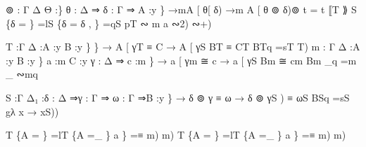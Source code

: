 \documentclass{acm_proc_article-sp}
\begin{document}
{\begin{code}
⊚ : \AgdaBound{\{}Γ Δ Θ :\}
       \AgdaBound{\{}θ : Δ ⇒ \AgdaBound{\{}δ : Γ ⇒ \AgdaBound{\{}A :y \}
       →m\AgdaSymbol{ (}\AgdaBound{(}A [ θ\AgdaFunction{ ]}\AgdaFunction{)}[ δ\AgdaFunction{ ]}) →m \AgdaBound{(}A [ θ ⊚ δ\AgdaFunction{ ]})⊚ t = t ⟦\AgdaFunction{ [⊚]}T ⟫
\AgdaFunction{
[+S]}S \{δ = \} =l\AgdaFunction{
[+S]}S \{δ = δ , \} =q\AgdaFunction{ [+S]}S p\AgdaFunction{ [⊚]}T ∾ m a ∾2\AgdaFunction{ [⊚]}) ∾+\AgdaFunction{ -})

T :\AgdaBound{\{}Γ Δ :\AgdaBound{\{}A :y \AgdaBound{\{}B :y \}
          \AgdaBound{\{}\AgdaBound{\{}\} → 
          A [ γ\AgdaFunction{ ]}T ≡ C 
       → A [ γ\AgdaFunction{ +}S B\AgdaFunction{ ]}T ≡ C\AgdaFunction{ +}T BTq =s\AgdaFunction{ [+S]}T T)
m : \AgdaBound{\{}Γ Δ :\AgdaBound{\{}A :y \AgdaBound{\{}B :y \}
          \AgdaBound{(}a :m \AgdaBound{\{}C :y \AgdaBound{\{}γ : Δ ⇒ \AgdaBound{\{}c :m \} →
          a [ γ\AgdaFunction{ ]t}m ≅ c 
        → a [ γ\AgdaFunction{ +}S B\AgdaFunction{ ]t}m ≅ cm Bm \_q =m \_ ∾mq

S :\AgdaBound{\{}Γ Δ₁ :\AgdaBound{\{}δ : Δ ⇒\AgdaBound{\{}γ : Γ ⇒ \AgdaBound{\{}ω : Γ ⇒\AgdaBound{\{}B :y \}
       → δ ⊚ γ ≡ ω
       → δ ⊚ \AgdaBound{(}γ\AgdaFunction{ +}S ) ≡ ω\AgdaFunction{ +}S BSq =s\AgdaFunction{ [+S]}S g\AgdaSymbol{ (}λ x → x\AgdaFunction{ +}S\AgdaSymbol{ \_}))

\AgdaFunction{
[⊚]}T \{A = \AgdaSymbol{*}\} =l\AgdaFunction{
[⊚]}T \{A =\_ \AgdaBound{\{}\} a \} =≡ m\AgdaSymbol{ \_}) m\AgdaSymbol{ \_}) 
T \{A = \AgdaSymbol{*}\} =lT \{A =\_ \AgdaBound{\{}\} a \} =≡  m\AgdaSymbol{ \_}) m\AgdaSymbol{ \_})

\<%
\end{code}
}
\end{document}
